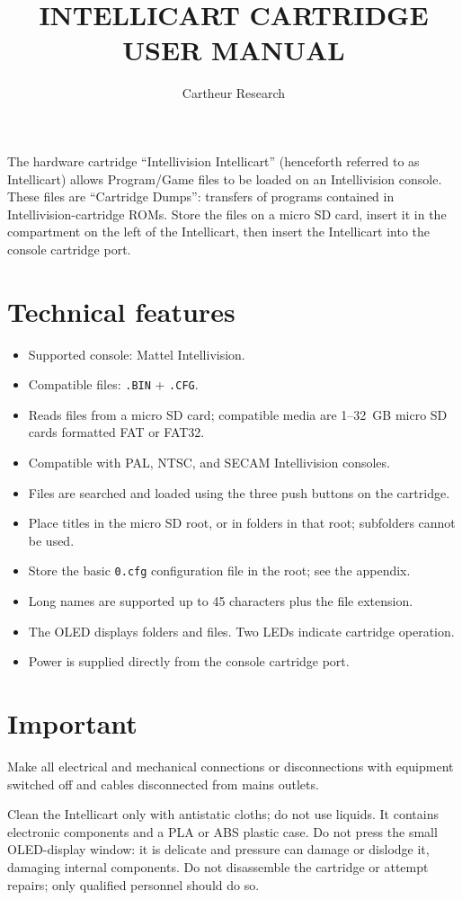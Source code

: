 \documentclass[a4paper,11pt]{article}
\title{INTELLICART CARTRIDGE\\USER MANUAL}
\author{Cartheur Research}
\date{}
\newcommand{\intellicart}{Intellicart}
\newcommand{\file}[1]{\texttt{#1}}
\begin{document}
\maketitle

The hardware cartridge ``Intellivision \intellicart'' (henceforth referred to as Intellicart) allows Program/Game files to be loaded on an Intellivision console. These files are ``Cartridge Dumps'': transfers of programs contained in Intellivision-cartridge ROMs. Store the files on a micro SD card, insert it in the compartment on the left of the Intellicart, then insert the Intellicart into the console cartridge port.

\section*{Technical features}
\begin{itemize}
  \item Supported console: Mattel Intellivision.
  \item Compatible files: \file{.BIN} + \file{.CFG}.
  \item Reads files from a micro SD card; compatible media are 1--32~GB micro SD cards formatted FAT or FAT32.
  \item Compatible with PAL, NTSC, and SECAM Intellivision consoles.
  \item Files are searched and loaded using the three push buttons on the cartridge.
  \item Place titles in the micro SD root, or in folders in that root; subfolders cannot be used.
  \item Store the basic \file{0.cfg} configuration file in the root; see the appendix.
  \item Long names are supported up to 45 characters plus the file extension.
  \item The OLED displays folders and files. Two LEDs indicate cartridge operation.
  \item Power is supplied directly from the console cartridge port.
\end{itemize}

\section*{Important}
Make all electrical and mechanical connections or disconnections with equipment switched off and cables disconnected from mains outlets.

Clean the Intellicart only with antistatic cloths; do not use liquids. It contains electronic components and a PLA or ABS plastic case. Do not press the small OLED-display window: it is delicate and pressure can damage or dislodge it, damaging internal components. Do not disassemble the cartridge or attempt repairs; only qualified personnel should do so.
\end{document}
